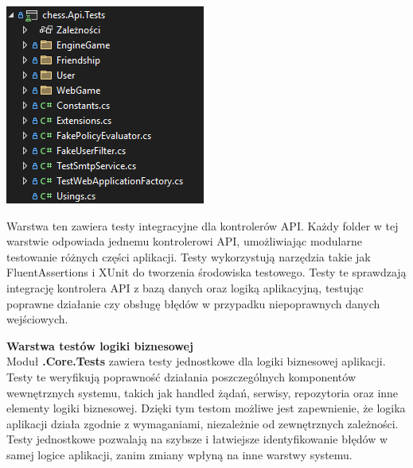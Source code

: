 \documentclass[12pt,a4paper]{article}
\begin{document}
\vspace{0.5cm}
\begin{minipage}[t]{0.45\textwidth}
    \vspace{0pt}
    \centering
    \includegraphics[width=\linewidth]{images/struktura_back_api_tests.png} 
\end{minipage}
\hfill
\begin{minipage}[t]{0.45\textwidth}
    \vspace{0pt}
    \raggedright
    Warstwa ten zawiera testy integracyjne dla kontrolerów API. Każdy folder w tej warstwie odpowiada jednemu kontrolerowi API, umożliwiając modularne testowanie różnych części aplikacji. Testy wykorzystują narzędzia takie jak FluentAssertions i XUnit do tworzenia środowiska testowego. Testy te sprawdzają integrację kontrolera API z bazą danych oraz logiką aplikacyjną, testując poprawne działanie czy obsługę błędów w przypadku niepoprawnych danych wejściowych.
\end{minipage}
\vspace{0.5cm}

\noindent \textbf{Warstwa testów logiki biznesowej}\\
Moduł \textbf{.Core.Tests} zawiera testy jednostkowe dla logiki biznesowej aplikacji. Testy te weryfikują poprawność działania poszczególnych komponentów wewnętrznych systemu, takich jak handled żądań, serwisy, repozytoria oraz inne elementy logiki biznesowej. Dzięki tym testom możliwe jest zapewnienie, że logika aplikacji działa zgodnie z wymaganiami, niezależnie od zewnętrznych zależności. Testy jednostkowe pozwalają na szybsze i łatwiejsze identyfikowanie błędów w samej logice aplikacji, zanim zmiany wpłyną na inne warstwy systemu.
\end{document}
